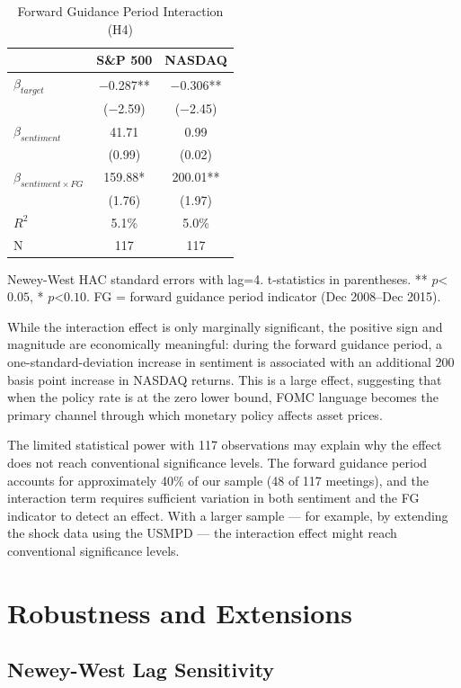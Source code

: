 \documentclass[12pt]{article}
\begin{document}
\begin{table}[htbp]
\centering
\caption{Forward Guidance Period Interaction (H4)}
\label{tab:h4}
\begin{tabular}{lcc}
\toprule
 & S\&P 500 & NASDAQ \\
\midrule
$\beta_{target}$ & $-$0.287** & $-$0.306** \\
 & ($-$2.59) & ($-$2.45) \\
$\beta_{sentiment}$ & 41.71 & 0.99 \\
 & (0.99) & (0.02) \\
$\beta_{sentiment \times FG}$ & 159.88* & 200.01** \\
 & (1.76) & (1.97) \\
\midrule
$R^2$ & 5.1\% & 5.0\% \\
N & 117 & 117 \\
\bottomrule
\end{tabular}
\footnotesize{Newey-West HAC standard errors with lag=4. t-statistics in parentheses. ** $p $<$ 0.05$, * $p $<$ 0.10$. FG = forward guidance period indicator (Dec 2008--Dec 2015).}
\end{table}


While the interaction effect is only marginally significant, the positive sign and magnitude are economically meaningful: during the forward guidance period, a one-standard-deviation increase in sentiment is associated with an additional 200 basis point increase in NASDAQ returns. This is a large effect, suggesting that when the policy rate is at the zero lower bound, FOMC language becomes the primary channel through which monetary policy affects asset prices.

The limited statistical power with 117 observations may explain why the effect does not reach conventional significance levels. The forward guidance period accounts for approximately 40\% of our sample (48 of 117 meetings), and the interaction term requires sufficient variation in both sentiment and the FG indicator to detect an effect. With a larger sample --- for example, by extending the shock data using the USMPD --- the interaction effect might reach conventional significance levels.


\section{Robustness and Extensions}

\subsection{Newey-West Lag Sensitivity}
\end{document}
